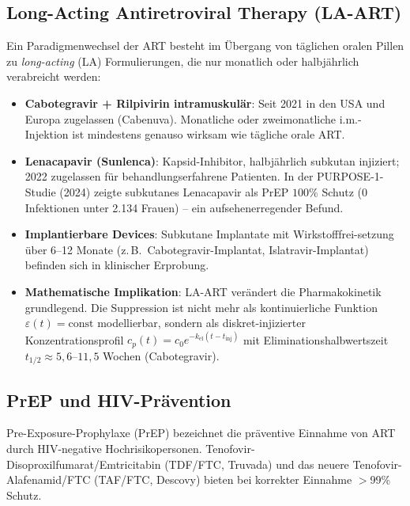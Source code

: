 ﻿\documentclass[a4paper,12pt]{article}
\theoremstyle{definition}
\begin{document}
\subsection{Long-Acting Antiretroviral Therapy (LA-ART)}

Ein Paradigmenwechsel der ART besteht im \"Ubergang von t\"aglichen oralen Pillen
zu \emph{long-acting} (LA) Formulierungen, die nur monatlich oder halbj\"ahrlich
verabreicht werden:

\begin{itemize}
\item \textbf{Cabotegravir + Rilpivirin intramuskulär}: Seit 2021 in den USA
      und Europa zugelassen (Cabenuva). Monatliche oder zweimonatliche i.m.-Injektion
      ist mindestens genauso wirksam wie t\"agliche orale ART.

\item \textbf{Lenacapavir (Sunlenca)}: Kapsid-Inhibitor, halbj\"ahrlich subkutan
      injiziert; 2022 zugelassen f\"ur behandlungserfahrene Patienten.
      In der PURPOSE-1-Studie (2024) zeigte subkutanes Lenacapavir als PrEP
      $100\%$ Schutz (0 Infektionen unter 2.134 Frauen) -- ein aufsehenerregender
      Befund.

\item \textbf{Implantierbare Devices}: Subkutane Implantate mit Wirkstofffrei-setzung
      \"uber 6--12 Monate (z.\,B.\ Cabotegravir-Implantat, Islatravir-Implantat)
      befinden sich in klinischer Erprobung.

\item \textbf{Mathematische Implikation}: LA-ART ver\"andert die Pharmakokinetik
      grundlegend. Die Suppression ist nicht mehr als kontinuierliche Funktion
      $\varepsilon(t) = \text{const}$ modellierbar, sondern als diskret-injizierter
      Konzentrationsprofil $c_p(t) = c_0 e^{-k_{\text{el}}(t - t_{\text{inj}})}$
      mit Eliminationshalbwertszeit $t_{1/2} \approx 5{,}6$--$11{,}5$ Wochen (Cabotegravir).
\end{itemize}

\subsection{PrEP und HIV-Pr\"avention}

Pre-Exposure-Prophylaxe (PrEP) bezeichnet die pr\"aventive Einnahme von ART durch
HIV-negative Hochrisikopersonen. Tenofovir-Disoproxilfumarat/Emtricitabin (TDF/FTC,
Truvada) und das neuere Tenofovir-Alafenamid/FTC (TAF/FTC, Descovy) bieten bei
korrekter Einnahme $>$99\% Schutz.
\end{document}
